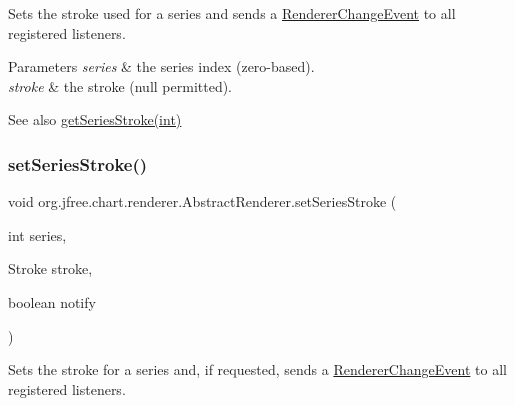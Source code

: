 Sets the stroke used for a series and sends a \mbox{\hyperlink{}{Renderer\+Change\+Event}} to all registered listeners.


\begin{DoxyParams}{Parameters}
{\em series} & the series index (zero-\/based). \\
\hline
{\em stroke} & the stroke ({\ttfamily null} permitted).\\
\hline
\end{DoxyParams}
\begin{DoxySeeAlso}{See also}
\mbox{\hyperlink{classorg_1_1jfree_1_1chart_1_1renderer_1_1_abstract_renderer_aa9fd470dafc2d0596ff1ea4ffcb210bc}{get\+Series\+Stroke(int)}} 
\end{DoxySeeAlso}
\mbox{\label{classorg_1_1jfree_1_1chart_1_1renderer_1_1_abstract_renderer_ab32a54a55641ca4e5d6471d3acb9a9ea}} 
\subsubsection{\texorpdfstring{set\+Series\+Stroke()}{setSeriesStroke()}\hspace{0.1cm}{\footnotesize\ttfamily [2/2]}}
{\footnotesize\ttfamily void org.\+jfree.\+chart.\+renderer.\+Abstract\+Renderer.\+set\+Series\+Stroke (\begin{DoxyParamCaption}\item[{int}]{series,  }\item[{Stroke}]{stroke,  }\item[{boolean}]{notify }\end{DoxyParamCaption})}

Sets the stroke for a series and, if requested, sends a \mbox{\hyperlink{}{Renderer\+Change\+Event}} to all registered listeners.


